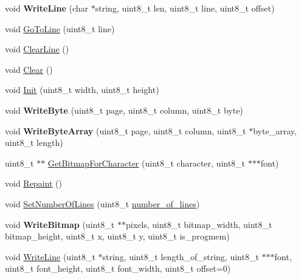 \begin{DoxyCompactItemize}
\item 
void {\bfseries Write\+Line} (char $\ast$string, uint8\+\_\+t len, uint8\+\_\+t line, uint8\+\_\+t offset)\hypertarget{class_o_l_e_d_ae565a0831cb79bb7c8840170a50e006b}{}\label{class_o_l_e_d_ae565a0831cb79bb7c8840170a50e006b}

\item 
void \hyperlink{class_o_l_e_d_a8d314130676b104ed959b92ab4bac25e}{Go\+To\+Line} (uint8\+\_\+t line)
\item 
void \hyperlink{class_o_l_e_d_a3a571f5ea7a183fa14932cd5b2c423eb}{Clear\+Line} ()
\item 
void \hyperlink{class_o_l_e_d_a6c7bb1fc91b3e574a275f90643da140a}{Clear} ()
\item 
void \hyperlink{class_o_l_e_d_a2c8205c8eac9d7a2b181657561e9b4d2}{Init} (uint8\+\_\+t width, uint8\+\_\+t height)
\item 
void {\bfseries Write\+Byte} (uint8\+\_\+t page, uint8\+\_\+t column, uint8\+\_\+t byte)\hypertarget{class_o_l_e_d_a7fa307269dbd2e80a6e48a1442df83d2}{}\label{class_o_l_e_d_a7fa307269dbd2e80a6e48a1442df83d2}

\item 
void {\bfseries Write\+Byte\+Array} (uint8\+\_\+t page, uint8\+\_\+t column, uint8\+\_\+t $\ast$byte\+\_\+array, uint8\+\_\+t length)\hypertarget{class_o_l_e_d_a7fffc17a5439300d361414c15a7a2dbe}{}\label{class_o_l_e_d_a7fffc17a5439300d361414c15a7a2dbe}

\item 
uint8\+\_\+t $\ast$$\ast$ \hyperlink{class_o_l_e_d_aa5b96cbf30cf3ad632942bf78c14ca3a}{Get\+Bitmap\+For\+Character} (uint8\+\_\+t character, uint8\+\_\+t $\ast$$\ast$$\ast$font)
\item 
void \hyperlink{class_o_l_e_d_a3efa34861b4ae0bc5323f6b7cf1d8a01}{Repaint} ()
\item 
void \hyperlink{class_o_l_e_d_aa3c88e19f05340036ea5ac9e2d1ea5dc}{Set\+Number\+Of\+Lines} (uint8\+\_\+t \hyperlink{class_o_l_e_d_a9ea1c55112deede1a61142af276a6bc9}{number\+\_\+of\+\_\+lines})
\item 
void {\bfseries Write\+Bitmap} (uint8\+\_\+t $\ast$$\ast$pixels, uint8\+\_\+t bitmap\+\_\+width, uint8\+\_\+t bitmap\+\_\+height, uint8\+\_\+t x, uint8\+\_\+t y, uint8\+\_\+t is\+\_\+progmem)\hypertarget{class_o_l_e_d_a541cf3d3db343ab33e4830b7dde05ca3}{}\label{class_o_l_e_d_a541cf3d3db343ab33e4830b7dde05ca3}

\item 
void \hyperlink{class_o_l_e_d_a2dad2faf86ce52ee5a6601ec54533c89}{Write\+Line} (uint8\+\_\+t $\ast$string, uint8\+\_\+t length\+\_\+of\+\_\+string, uint8\+\_\+t $\ast$$\ast$$\ast$font, uint8\+\_\+t font\+\_\+height, uint8\+\_\+t font\+\_\+width, uint8\+\_\+t offset=0)
\end{DoxyCompactItemize}
